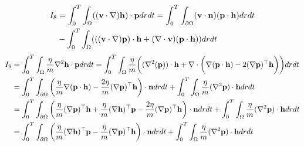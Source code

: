\begin{align*}
I_8&=\int_0^T \int_\Omega ((\mathbf{v} \cdot \nabla)\mathbf{h}) \cdot \mathbf{p} dr dt
= \int_0^T \int_{\partial \Omega}(\mathbf{v} \cdot \mathbf{n})(\mathbf{p} \cdot \mathbf{h})dr dt \\
&- \int_0^T \int_\Omega ( ((\mathbf{v} \cdot \nabla)\mathbf{p})\cdot \mathbf{h} +(\nabla \cdot \mathbf{v})(\mathbf{p} \cdot \mathbf{h}) )drdt
\end{align*}
\begin{align*}
I_9 &= \int_0^T \int_\Omega \frac{\eta}{m} \nabla^2 \mathbf{h} \cdot \mathbf{p} dr dt =
\int_0^T \int_\Omega \frac{\eta}{m} \bigg( ( \nabla^2 (\mathbf{p}) ) \cdot \mathbf{h} + \nabla \cdot \bigg( \nabla ( \mathbf{p} \cdot \mathbf{h} ) - 2 (\nabla\mathbf{p})^\top \mathbf{h} \bigg) \bigg) dr dt\\
&= \int_0^T \int_{\partial \Omega} \bigg(\frac{\eta}{m}  \nabla ( \mathbf{p} \cdot \mathbf{h} ) - \frac{2\eta}{m}  (\nabla \mathbf{p})^\top \mathbf{h} \bigg) \cdot \mathbf{n} dr dt + \int_0^T \int_\Omega\frac{\eta}{m}  ( \nabla^2 \mathbf{p} ) \cdot \mathbf{h} dr dt\\
&=\int_0^T \int_{\partial \Omega} \bigg(\frac{\eta}{m} (\nabla \mathbf{p})^\top \mathbf{h} + \frac{\eta}{m}(\nabla \mathbf{h})^\top \mathbf{p} - \frac{2\eta}{m}  (\nabla \mathbf{p})^\top \mathbf{h} \bigg) \cdot \mathbf{n} dr dt + \int_0^T \int_\Omega\frac{\eta}{m}  ( \nabla^2 \mathbf{p} ) \cdot \mathbf{h} dr dt \\
&=\int_0^T \int_{\partial \Omega} \bigg(\frac{\eta}{m}(\nabla \mathbf{h})^\top \mathbf{p} - \frac{\eta}{m}  (\nabla \mathbf{p})^\top \mathbf{h} \bigg) \cdot \mathbf{n} dr dt + \int_0^T \int_\Omega\frac{\eta}{m}  ( \nabla^2 \mathbf{p} ) \cdot \mathbf{h} dr dt
\end{align*}


